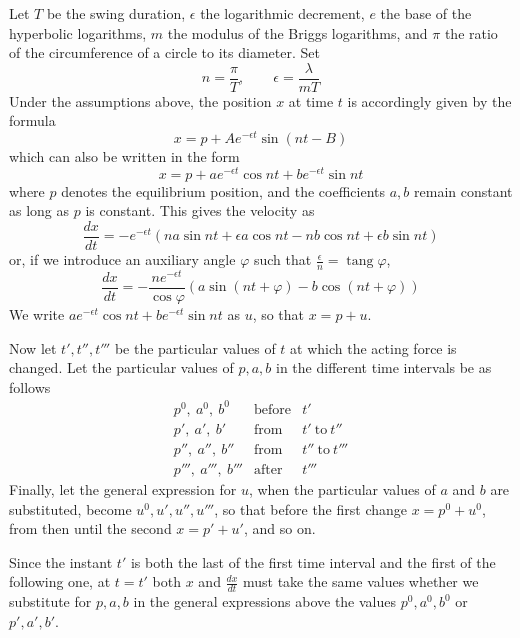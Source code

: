 Let $T$ be the swing duration, $\epsilon$ the logarithmic decrement, $e$ the base of the hyperbolic logarithms, $m$ the modulus of the Briggs logarithms, and $\pi$ the ratio of the circumference of a circle to its diameter. Set
\[
n=\frac{\pi}{T},\qquad \epsilon=\frac{\lambda}{mT}
\]
Under the assumptions above, the position $x$ at time $t$ is accordingly given by the formula
\[
x=p+Ae^{-\epsilon t}\sin(nt-B)
\]
which can also be written in the form
\[
x=p+ae^{-\epsilon t}\cos nt+be^{-\epsilon t}\sin nt
\]
where $p$ denotes the equilibrium position, and the coefficients $a,b$ remain constant as long as $p$ is constant. This gives the velocity as
\[
\frac{dx}{dt}=-e^{-\epsilon t}(na\sin nt+\epsilon a\cos nt-nb\cos nt+\epsilon b\sin nt)
\]
or, if we introduce an auxiliary angle $\varphi$ such that $\frac{\epsilon}{n}=\operatorname{tang}\varphi$,
\[
\frac{dx}{dt}=-\frac{ne^{-\epsilon t}}{\cos\varphi}(a\sin(nt+\varphi)-b\cos(nt+\varphi))
\]
We write $ae^{-\epsilon t}\cos nt+be^{-\epsilon t}\sin nt$ as $u$, so that $x=p+u$.

Now let $t',t'',t'''$ be the particular values of $t$ at which the acting force is changed. Let the particular values of $p,a,b$ in the different time intervals be as follows
\[
\begin{array}{lll}
p^0,\ a^0,\ b^0&\text{before}&t'\\
p',\ a',\ b'&\text{from}&t'\ \text{to}\ t''\\
p'',\ a'',\ b''&\text{from}&t''\ \text{to}\ t'''\\
p''',\ a''',\ b'''&\text{after}&t'''
\end{array}
\]
Finally, let the general expression for $u$, when the particular values of $a$ and $b$ are substituted, become $u^0,u',u'',u'''$, so that before the first change $x=p^0+u^0$, from then until the second $x=p'+u'$, and so on.

Since the instant $t'$ is both the last of the first time interval and the first of the following one, at $t=t'$ both $x$ and $\frac{dx}{dt}$ must take the same values whether we substitute for $p,a,b$ in the general expressions above the values $p^0,a^0,b^0$ or $p',a',b'$.

